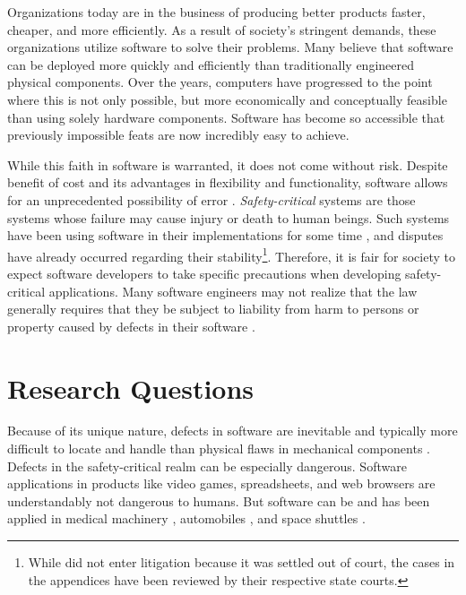 \documentclass[12pt]{report}
\begin{document}
Organizations today are in the business of producing better products faster, cheaper, and more efficiently. As a result of society's stringent demands, these organizations utilize software to solve their problems. Many believe that software can be deployed more quickly and efficiently than traditionally engineered physical components. Over the years, computers have progressed to the point where this is not only possible, but more economically and conceptually feasible than using solely hardware components. Software has become so accessible that previously impossible feats are now incredibly easy to achieve.  

While this faith in software is warranted, it does not come without risk. Despite benefit of cost and its advantages in flexibility and functionality, software allows for an unprecedented possibility of error \cite{Brooks87}. \textit{Safety-critical} systems are those systems whose failure may cause injury or death to human beings. Such systems have been using software in their implementations for some time \cite{Therac25}, and disputes have already occurred regarding their stability\footnote{While \cite{Therac25} did not enter litigation because it was settled out of court, the cases in the appendices have been reviewed by their respective state courts.}. Therefore, it is fair for society to expect software developers to take specific precautions when developing safety-critical applications. Many software engineers may not realize that the law generally requires that they be subject to liability from harm to persons or property caused by defects in their software \cite{FAKE}. 

\section{Research Questions}  

Because of its unique nature, defects in software are inevitable and typically more difficult to locate and handle than physical flaws in mechanical components \cite{Parnas90}. Defects in the safety-critical realm can be especially dangerous. Software applications in products like video games, spreadsheets, and web browsers are understandably not dangerous to humans. But software can be and has been applied in medical machinery \cite{FAKE}, automobiles \cite{FAKE}, and space shuttles \cite{FAKE}. 
\end{document}
